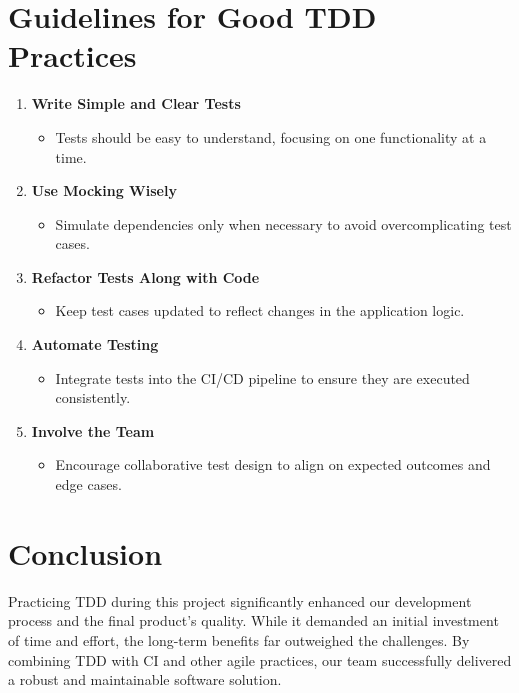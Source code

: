 \documentclass[a4paper,12pt]{article}
\begin{document}
\section{Guidelines for Good TDD Practices}
\begin{enumerate}
    \item \textbf{Write Simple and Clear Tests}
        \begin{itemize}
            \item Tests should be easy to understand, focusing on one functionality at a time.
\end{itemize}
\item \textbf{Use Mocking Wisely}
    \begin{itemize}
        \item Simulate dependencies only when necessary to avoid overcomplicating test cases.
\end{itemize}
\item \textbf{Refactor Tests Along with Code}
    \begin{itemize}
        \item Keep test cases updated to reflect changes in the application logic.
    \end{itemize}
\item \textbf{Automate Testing}
    \begin{itemize}
        \item Integrate tests into the CI/CD pipeline to ensure they are executed consistently.
\end{itemize}
\item \textbf{Involve the Team}
    \begin{itemize}
        \item Encourage collaborative test design to align on expected outcomes and edge cases.
\end{itemize}
\end{enumerate}
\section{Conclusion}
Practicing TDD during this project significantly enhanced our development process and the final product’s
quality. While it demanded an initial investment of time and effort, the long-term benefits far outweighed the
challenges. By combining TDD with CI and other agile practices, our team successfully delivered a robust and
maintainable software solution.
\end{document}
